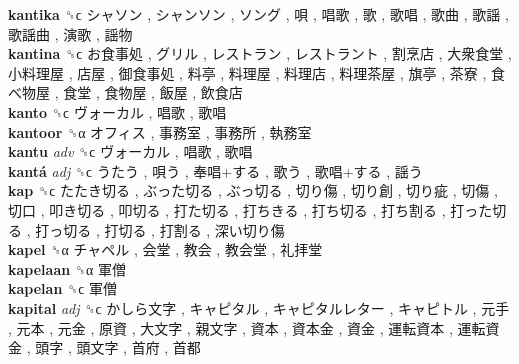 \textbf{kantika} ␝ϲ   シャソン ,  シャンソン ,  ソング ,  唄 ,  唱歌 ,  歌 ,  歌唱 ,  歌曲 ,  歌謡 ,  歌謡曲 ,  演歌 ,  謡物   \\
\textbf{kantina} ␝ϲ   お食事処 ,  グリル ,  レストラン ,  レストラント ,  割烹店 ,  大衆食堂 ,  小料理屋 ,  店屋 ,  御食事処 ,  料亭 ,  料理屋 ,  料理店 ,  料理茶屋 ,  旗亭 ,  茶寮 ,  食べ物屋 ,  食堂 ,  食物屋 ,  飯屋 ,  飲食店   \\
\textbf{kanto} ␝ϲ   ヴォーカル ,  唱歌 ,  歌唱   \\
\textbf{kantoor} ␝α   オフィス ,  事務室 ,  事務所 ,  執務室   \\
\textbf{kantu} \emph{adv}  ␝ϲ   ヴォーカル ,  唱歌 ,  歌唱   \\
\textbf{kantá} \emph{adj}  ␝ϲ   うたう ,  唄う ,  奉唱+する ,  歌う ,  歌唱+する ,  謡う   \\
\textbf{kap} ␝ϲ   たたき切る ,  ぶった切る ,  ぶっ切る ,  切り傷 ,  切り創 ,  切り疵 ,  切傷 ,  切口 ,  叩き切る ,  叩切る ,  打た切る ,  打ちきる ,  打ち切る ,  打ち割る ,  打った切る ,  打っ切る ,  打切る ,  打割る ,  深い切り傷   \\
\textbf{kapel} ␝α   チャペル ,  会堂 ,  教会 ,  教会堂 ,  礼拝堂   \\
\textbf{kapelaan} ␝α   軍僧   \\
\textbf{kapelan} ␝ϲ   軍僧   \\
\textbf{kapital} \emph{adj}  ␝ϲ   かしら文字 ,  キャピタル ,  キャピタルレター ,  キャピトル ,  元手 ,  元本 ,  元金 ,  原資 ,  大文字 ,  親文字 ,  資本 ,  資本金 ,  資金 ,  運転資本 ,  運転資金 ,  頭字 ,  頭文字 ,  首府 ,  首都   \\
